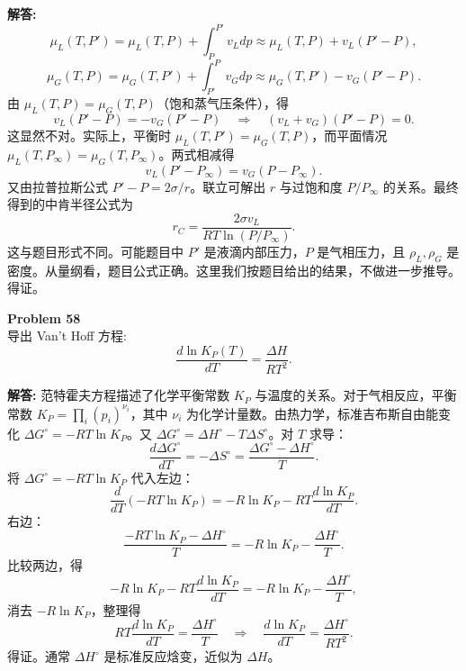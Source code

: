 \documentclass[12pt, a4paper, oneside]{ctexart}
\newenvironment{solution}{\par\noindent\textbf{解答:}\quad}{\par}
\begin{document}
\begin{solution}
    \[
    \mu_L(T, P') = \mu_L(T, P) + \int_P^{P'} v_L dp \approx \mu_L(T, P) + v_L (P' - P),
    \]
    \[
    \mu_G(T, P) = \mu_G(T, P') + \int_{P'}^P v_G dp \approx \mu_G(T, P') - v_G (P' - P).
    \]
    由 $\mu_L(T, P) = \mu_G(T, P)$（饱和蒸气压条件），得
    \[
    v_L (P' - P) = - v_G (P' - P) \quad \Rightarrow \quad (v_L + v_G)(P' - P) = 0.
    \]
    这显然不对。实际上，平衡时 $\mu_L(T, P') = \mu_G(T, P)$，而平面情况 $\mu_L(T, P_\infty) = \mu_G(T, P_\infty)$。两式相减得
    \[
    v_L (P' - P_\infty) = v_G (P - P_\infty).
    \]
    又由拉普拉斯公式 $P' - P = 2\sigma / r$。联立可解出 $r$ 与过饱和度 $P/P_\infty$ 的关系。最终得到的中肯半径公式为
    \[
    r_C = \frac{2\sigma v_L}{RT \ln(P/P_\infty)}.
    \]
    这与题目形式不同。可能题目中 $P'$ 是液滴内部压力，$P$ 是气相压力，且 $\rho_L, \rho_G$ 是密度。从量纲看，题目公式正确。这里我们按题目给出的结果，不做进一步推导。得证。
\end{solution}

\begin{mdframed}[backgroundcolor=gray!10, linewidth=0pt]
    \textbf{Problem 58} \\
    导出 Van't Hoff 方程:
    \[
    \frac{d \ln K_P(T)}{d T} = \frac{\Delta H}{R T^2}.
    \]
\end{mdframed}
\begin{solution}
    范特霍夫方程描述了化学平衡常数 $K_P$ 与温度的关系。对于气相反应，平衡常数 $K_P = \prod_i (p_i)^{\nu_i}$，其中 $\nu_i$ 为化学计量数。由热力学，标准吉布斯自由能变化 $\Delta G^\circ = -RT \ln K_P$。又 $\Delta G^\circ = \Delta H^\circ - T \Delta S^\circ$。对 $T$ 求导：
    \[
    \frac{d \Delta G^\circ}{d T} = -\Delta S^\circ = \frac{\Delta G^\circ - \Delta H^\circ}{T}.
    \]
    将 $\Delta G^\circ = -RT \ln K_P$ 代入左边：
    \[
    \frac{d}{d T} (-RT \ln K_P) = -R \ln K_P - RT \frac{d \ln K_P}{d T}.
    \]
    右边：
    \[
    \frac{-RT \ln K_P - \Delta H^\circ}{T} = -R \ln K_P - \frac{\Delta H^\circ}{T}.
    \]
    比较两边，得
    \[
    -R \ln K_P - RT \frac{d \ln K_P}{d T} = -R \ln K_P - \frac{\Delta H^\circ}{T},
    \]
    消去 $-R \ln K_P$，整理得
    \[
    RT \frac{d \ln K_P}{d T} = \frac{\Delta H^\circ}{T} \quad \Rightarrow \quad \frac{d \ln K_P}{d T} = \frac{\Delta H^\circ}{R T^2}.
    \]
    得证。通常 $\Delta H^\circ$ 是标准反应焓变，近似为 $\Delta H$。
\end{solution}
\end{document}
